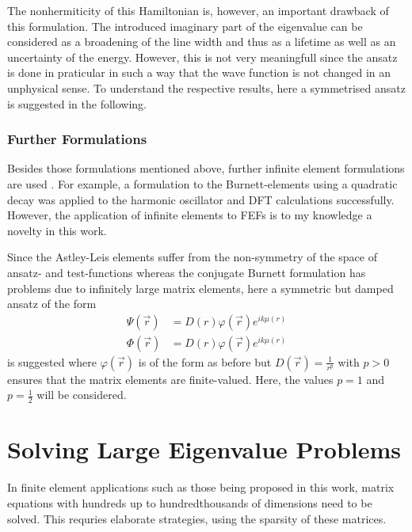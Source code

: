 The nonhermiticity of this Hamiltonian is, however, an important drawback of this formulation.
The introduced imaginary part of the eigenvalue can be considered as a broadening of the line width and thus as a lifetime as well as an uncertainty of the energy.
However, this is not very meaningfull since the ansatz is done in praticular in such a way that the wave function is not changed in an unphysical sense.
To understand the respective results, here a symmetrised ansatz is suggested in the following.

\subsubsection{Further Formulations}
Besides those formulations mentioned above, further infinite element formulations are used \cite{dreyer}.
For example, a formulation to the Burnett-elements using a quadratic decay was applied to the harmonic oscillator \cite{bettessHarmonic} and DFT calculations \cite{sobaMolecule} successfully.
However, the application of infinite elements to FEFs is to my knowledge a novelty in this work.

Since the Astley-Leis elements suffer from the non-symmetry of the space of ansatz- and test-functions whereas the conjugate Burnett formulation has problems due to infinitely large matrix elements, here a symmetric but damped ansatz of the form
\begin{align} \label{eq:ALsymm}
\Psi(\vec{r}) &= D(r)\varphi(\vec{r}) e^{ik\mu(r)} \\
\Phi(\vec{r}) &= D(r)\varphi(\vec{r}) e^{ik\mu(r)}
\end{align}
is suggested where $\varphi(\vec{r})$ is of the form as before but $D(\vec{r})=\frac{1}{r^p}$ with $p>0$ ensures that the matrix elements are finite-valued.
Here, the values $p=1$ and $p=\frac 12$ will be considered.

\section{Solving Large Eigenvalue Problems}
In finite element applications such as those being proposed in this work, matrix equations with hundreds up to hundredthousands of dimensions need to be solved.
This requries elaborate strategies, using the sparsity of these matrices.

